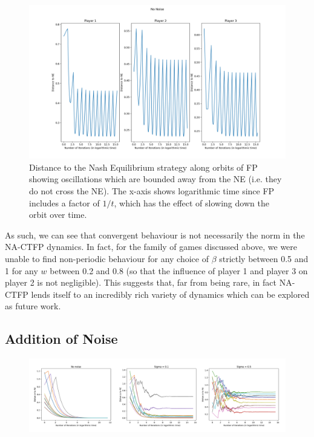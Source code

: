 \documentclass{article}
\theoremstyle{definition}
\begin{document}
  \begin{figure}[t]
    \centering
    \includegraphics[width = 0.7 \textwidth]{Figures/3PlayerChainNoNoise.png}
    \caption{\label{fig::3PlayerChainNoNoise} Distance to the Nash Equilibrium strategy along orbits
    of FP showing oscillations which are bounded away from the NE (i.e. they do not cross the NE).
    The x-axis shows logarithmic time since FP includes a factor of $1/t$, which has the effect of
    slowing down the orbit over time.}
  \end{figure}

  As such, we can see that convergent behaviour is not necessarily the norm in the NA-CTFP dynamics. In fact, for the family of games discussed above, we were unable to find non-periodic behaviour for any choice of $\beta$ strictly between 0.5 and 1 for any $w$ between 0.2 and 0.8 (so that the influence of player 1 and player 3 on player 2 is not negligible). This suggests that, far from being rare, in fact NA-CTFP lends itself to an incredibly rich variety of dynamics which can be explored as future work.
  

  \subsection{Addition of Noise}

  \begin{figure}[t]
    \centering
    \includegraphics[width = \columnwidth]{Figures/Noise10Player.png}
    \caption{\label{fig::Noise10Player}}
  \end{figure}
\end{document}
